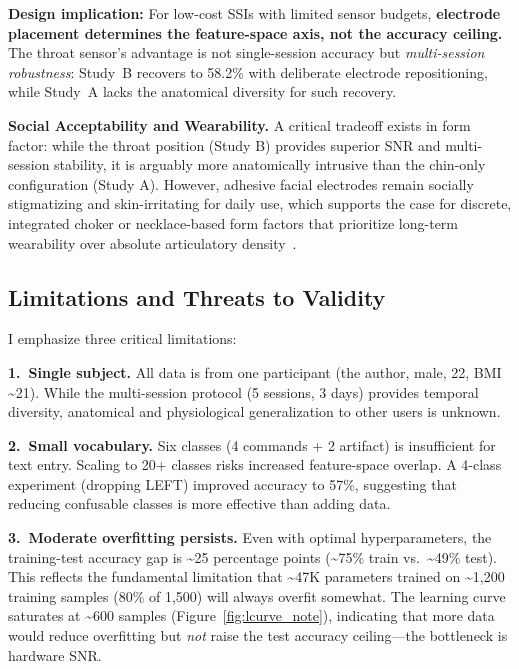 \documentclass[11pt, a4paper]{article}
\begin{document}
\textbf{Design implication:} For low-cost SSIs with limited sensor budgets, \textbf{electrode placement determines the feature-space axis, not the accuracy ceiling.} The throat sensor's advantage is not single-session accuracy but \emph{multi-session robustness}: Study~B recovers to 58.2\% with deliberate electrode repositioning, while Study~A lacks the anatomical diversity for such recovery.

\textbf{Social Acceptability and Wearability.} A critical tradeoff exists in form factor: while the throat position (Study B) provides superior SNR and multi-session stability, it is arguably more anatomically intrusive than the chin-only configuration (Study A). However, adhesive facial electrodes remain socially stigmatizing and skin-irritating for daily use, which supports the case for discrete, integrated choker or necklace-based form factors that prioritize long-term wearability over absolute articulatory density~\cite{kapur2018}.

\subsection{Limitations and Threats to Validity}
\label{sec:limitations}

I emphasize three critical limitations:

\textbf{1.\ Single subject.} All data is from one participant (the author, male, 22, BMI \textasciitilde21). While the multi-session protocol (5 sessions, 3 days) provides temporal diversity, anatomical and physiological generalization to other users is unknown.

\textbf{2.\ Small vocabulary.} Six classes (4 commands + 2 artifact) is insufficient for text entry. Scaling to 20+ classes risks increased feature-space overlap. A 4-class experiment (dropping LEFT) improved accuracy to 57\%, suggesting that reducing confusable classes is more effective than adding data.

\textbf{3.\ Moderate overfitting persists.} Even with optimal hyperparameters, the training-test accuracy gap is \textasciitilde25 percentage points (\textasciitilde75\% train vs.\ \textasciitilde49\% test). This reflects the fundamental limitation that \textasciitilde47K parameters trained on \textasciitilde1,200 training samples (80\% of 1,500) will always overfit somewhat. The learning curve saturates at \textasciitilde600 samples (Figure~\ref{fig:lcurve_note}), indicating that more data would reduce overfitting but \emph{not} raise the test accuracy ceiling---the bottleneck is hardware SNR.
\end{document}
